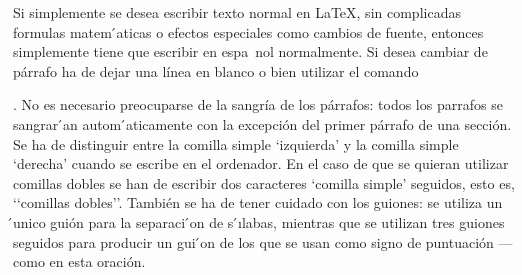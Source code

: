 \documentclass[a4paper,10pt]{letter}
\begin{document}
Si simplemente se desea escribir texto normal en LaTeX,
 sin complicadas formulas matem ́aticas o efectos especiales
 como cambios de fuente, entonces simplemente tiene que escribir
 en espa~nol normalmente.
 Si desea cambiar de párrafo ha de dejar una línea en blanco o bien
 utilizar el comando \par.
 No es necesario preocuparse de la sangría de los párrafos:
 todos los parrafos se sangrar ́an autom ́aticamente con la excepción
 del primer párrafo de una sección.
 Se ha de distinguir entre la comilla simple ‘izquierda’
 y la comilla simple ‘derecha’ cuando se escribe en el ordenador.
 En el caso de que se quieran utilizar comillas dobles se han de
 escribir dos caracteres ‘comilla simple’ seguidos, esto es,
 ‘‘comillas dobles’’.
 También se ha de tener cuidado con los guiones: se utiliza un ́unico
 guión para la separaci ́on de s ́ılabas, mientras que se utilizan
 tres guiones seguidos para producir un gui ́on de los que se usan
 como signo de puntuación --- como en esta oración.
\end{document}

